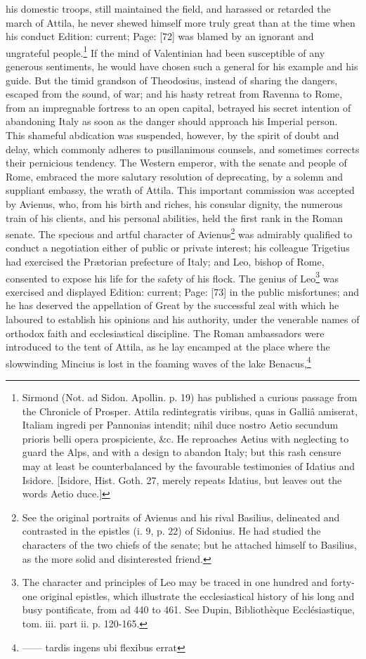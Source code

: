 his domestic troops, still maintained the field, and harassed or retarded the march of Attila, he never shewed himself more truly great than at the time when his conduct Edition: current; Page: [72] was blamed by an ignorant and ungrateful people.\footnote{Sirmond (Not. ad Sidon. Apollin. p. 19) has published a curious passage from the Chronicle of Prosper. Attila redintegratis viribus, quas in Galliâ amiserat, Italiam ingredi per Pannonias intendit; nihil duce nostro Aetio secundum prioris belli opera prospiciente, \&c. He reproaches Aetius with neglecting to guard the Alps, and with a design to abandon Italy; but this rash censure may at least be counterbalanced by the favourable testimonies of Idatius and Isidore. [Isidore, Hist. Goth. 27, merely repeats Idatius, but leaves out the words Aetio duce.]} If the mind of Valentinian had been susceptible of any generous sentiments, he would have chosen such a general for his example and his guide. But the timid grandson of Theodosius, instead of sharing the dangers, escaped from the sound, of war; and his hasty retreat from Ravenna to Rome, from an impregnable fortress to an open capital, betrayed his secret intention of abandoning Italy as soon as the danger should approach his Imperial person. This shameful abdication was suspended, however, by the spirit of doubt and delay, which commonly adheres to pusillanimous counsels, and sometimes corrects their pernicious tendency. The Western emperor, with the senate and people of Rome, embraced the more salutary resolution of deprecating, by a solemn and suppliant embassy, the wrath of Attila. This important commission was accepted by Avienus, who, from his birth and riches, his consular dignity, the numerous train of his clients, and his personal abilities, held the first rank in the Roman senate. The specious and artful character of Avienus\footnote{See the original portraits of Avienus and his rival Basilius, delineated and contrasted in the epistles (i. 9, p. 22) of Sidonius. He had studied the characters of the two chiefs of the senate; but he attached himself to Basilius, as the more solid and disinterested friend.} was admirably qualified to conduct a negotiation either of public or private interest; his colleague Trigetius had exercised the Prætorian prefecture of Italy; and Leo, bishop of Rome, consented to expose his life for the safety of his flock. The genius of Leo\footnote{The character and principles of Leo may be traced in one hundred and forty-one original epistles, which illustrate the ecclesiastical history of his long and busy pontificate, from ad 440 to 461. See Dupin, Bibliothèque Ecclésiastique, tom. iii. part ii. p. 120-165.} was exercised and displayed Edition: current; Page: [73] in the public misfortunes; and he has deserved the appellation of Great by the successful zeal with which he laboured to establish his opinions and his authority, under the venerable names of orthodox faith and ecclesiastical discipline. The Roman ambassadors were introduced to the tent of Attila, as he lay encamped at the place where the slowwinding Mincius is lost in the foaming waves of the lake Benacus,\footnote{\texthebrew{——} tardis ingens ubi flexibus errat

}
